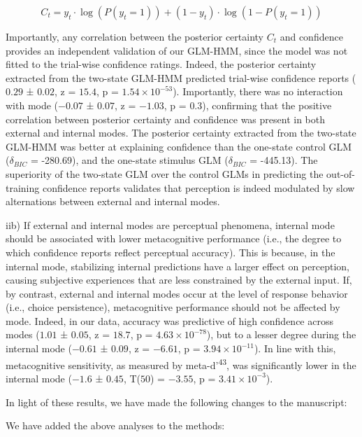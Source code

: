 \documentclass[
]{article}
\begin{document}
\[
C_t = y_t \cdot \log(P(y_t = 1)) + (1 - y_t) \cdot \log(1 - P(y_t = 1)) 
\]

Importantly, any correlation between the posterior certainty \(C_t\) and
confidence provides an independent validation of our GLM-HMM, since the
model was not fitted to the trial-wise confidence ratings. Indeed, the
posterior certainty extracted from the two-state GLM-HMM predicted
trial-wise confidence reports (\(0.29\) ± \(0.02\), z = \(15.4\), p =
\(\ensuremath{1.54\times 10^{-53}}\)). Importantly, there was no
interaction with mode (\(-0.07\) ± \(0.07\), z = \(-1.03\), p =
\(0.3\)), confirming that the positive correlation between posterior
certainty and confidence was present in both external and internal
modes. The posterior certainty extracted from the two-state GLM-HMM was
better at explaining confidence than the one-state control GLM
(\(\delta_{BIC}\) = -280.69), and the one-state stimulus GLM
(\(\delta_{BIC}\) = -445.13). The superiority of the two-state GLM over
the control GLMs in predicting the out-of-training confidence reports
validates that perception is indeed modulated by slow alternations
between external and internal modes.

iib) If external and internal modes are perceptual phenomena, internal
mode should be associated with lower metacognitive performance (i.e.,
the degree to which confidence reports reflect perceptual accuracy).
This is because, in the internal mode, stabilizing internal predictions
have a larger effect on perception, causing subjective experiences that
are less constrained by the external input. If, by contrast, external
and internal modes occur at the level of response behavior (i.e., choice
persistence), metacognitive performance should not be affected by mode.
Indeed, in our data, accuracy was predictive of high confidence across
modes (\(1.01\) ± \(0.05\), z = \(18.7\), p =
\(\ensuremath{4.63\times 10^{-78}}\)), but to a lesser degree during the
internal mode (\(-0.61\) ± \(0.09\), z = \(-6.61\), p =
\(\ensuremath{3.94\times 10^{-11}}\)). In line with this, metacognitive
sensitivity, as measured by meta-d'\textsuperscript{43}, was
significantly lower in the internal mode (\(-1.6\) ± \(0.45\), T(\(50\))
= \(-3.55\), p = \(\ensuremath{3.41\times 10^{-3}}\)).

In light of these results, we have made the following changes to the
manuscript:

We have added the above analyses to the methods:
\end{document}
